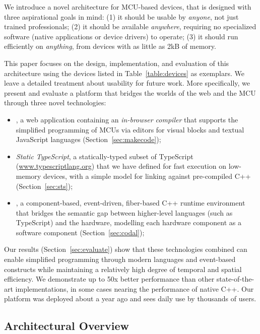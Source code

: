 We introduce a novel architecture for MCU-based devices,
that is designed with three aspirational goals in mind:
(1) it should be usable by \emph{anyone}, not just trained professionals;
(2) it should be available \emph{anywhere}, requiring no specialized software (native applications
or device drivers) to operate;
(3) it should run efficiently on \emph{anything}, from devices with as little as 2kB of memory.

This paper focuses on the design, implementation, and evaluation of this architecture using the devices listed in Table~\ref{table:devices} as exemplars. We leave a detailed treatment about usability for future work.
More specifically, we present and evaluate a platform that bridges the worlds of the web and the
MCU through three novel technologies:

\begin{itemize}
\item \emph{\MCN}, a web application containing an \emph{in-browser compiler} that supports the
simplified programming of MCUs via editors for visual blocks and textual JavaScript languages
(Section~\ref{sec:makecode});

\item \emph{Static TypeScript}, a statically-typed subset of TypeScript
(\url{www.typescriptlang.org}) that we have defined for fast execution on low-memory devices,
with a simple model for linking against pre-compiled C++ (Section~\ref{sec:sts});

\item \emph{\CO}, a component-based, event-driven, fiber-based C++ runtime environment
that bridges the semantic gap between higher-level languages (such as TypeScript) and the hardware,
modelling each hardware component as a software component (Section~\ref{sec:codal});
\end{itemize}
Our results (Section~\ref{sec:evaluate}) show that these technologies combined can enable simplified programming through modern
languages and event-based constructs while maintaining a relatively high degree of temporal and spatial efficiency.
We demonstrate up to 50x better performance than other state-of-the-art implementations,
in some cases nearing the performance of native C++.  Our platform was deployed about a year ago and sees daily use by thousands of users.

\subsection{Architectural Overview}

